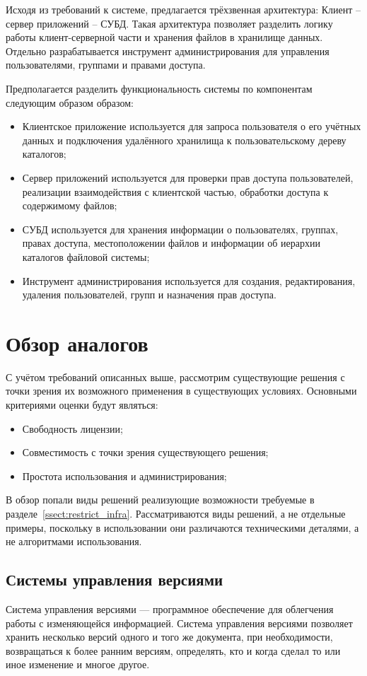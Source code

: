 \documentclass[utf8,usehyperref,12pt]{G7-32}
\begin{document}
Исходя из требований к системе, предлагается трёхзвенная архитектура: Клиент -- сервер приложений -- СУБД. Такая архитектура позволяет разделить логику работы клиент-серверной части и хранения файлов в хранилище данных. Отдельно разрабатывается инструмент администрирования для управления пользователями, группами и правами доступа.

Предполагается разделить функциональность системы по компонентам следующим образом образом:
\begin{itemize}
 \item Клиентское приложение используется для запроса пользователя о его учётных данных и подключения удалённого хранилища к пользовательскому дереву каталогов;
 \item Сервер приложений используется для проверки прав доступа пользователей, реализации взаимодействия с клиентской частью, обработки доступа к содержимому файлов;
 \item СУБД используется для хранения информации о пользователях, группах, правах доступа, местоположении файлов и информации об иерархии каталогов файловой системы;
 \item Инструмент администрирования используется для создания, редактирования, удаления пользователей, групп и назначения прав доступа.
\end{itemize}

\section{Обзор аналогов}\label{sect_analogs}
С учётом требований описанных выше, рассмотрим существующие решения с точки зрения их возможного применения в существующих условиях. Основными критериями оценки будут являться:
\begin{itemize}
 \item Свободность лицензии;
 \item Совместимость с точки зрения существующего решения;
 \item Простота использования и администрирования;
\end{itemize}

В обзор попали виды решений реализующие возможности требуемые в разделе~\ref{ssect:restrict_infra}. Рассматриваются виды решений, а не отдельные примеры, поскольку в использовании они различаются техническими деталями, а не алгоритмами использования.

\subsection{Системы управления версиями}
Система управления версиями — программное обеспечение для облегчения работы с изменяющейся информацией. Система управления версиями позволяет хранить несколько версий одного и того же документа, при необходимости, возвращаться к более ранним версиям, определять, кто и когда сделал то или иное изменение и многое другое.
\end{document}
